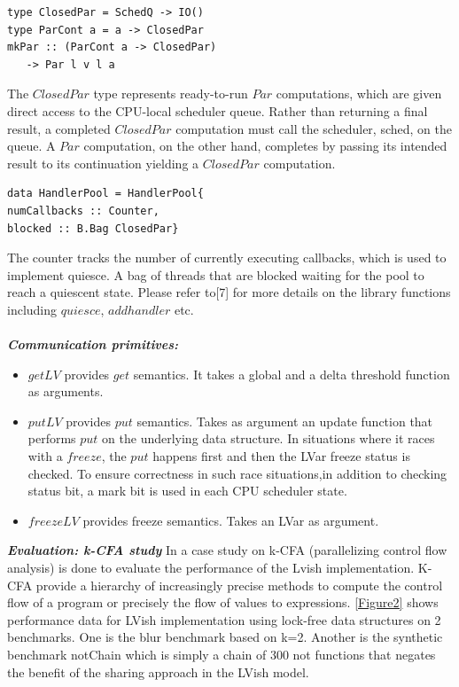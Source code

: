 \documentclass[twocolumn]{article}
\begin{document}
\begin{verbatim}
type ClosedPar = SchedQ -> IO()
type ParCont a = a -> ClosedPar
mkPar :: (ParCont a -> ClosedPar)
   -> Par l v l a
\end{verbatim}
The $ClosedPar$ type represents ready-to-run $Par$ computations, which are given direct access to the CPU-local scheduler queue. Rather than returning a final result, a completed $ClosedPar$ computation must call the scheduler, sched, on the queue. A $Par$
computation, on the other hand, completes by passing its intended result to its continuation yielding a $ClosedPar$ computation.
\begin{verbatim}
data HandlerPool = HandlerPool{
numCallbacks :: Counter,
blocked :: B.Bag ClosedPar}
\end{verbatim}
The counter tracks the number of currently executing callbacks, which is used to implement quiesce. A bag of threads that are blocked waiting for the pool to reach a quiescent state. Please refer to[7] for more details on the library functions
including $quiesce$, $addhandler$ etc.\\ \\
\textbf{\textit{Communication primitives:}}
\begin{itemize}
\item $getLV$ provides $get$ semantics. It takes a global and a delta threshold function as arguments.
\item $putLV$ provides $put$ semantics. Takes as argument an update function that performs $put$ on the underlying data structure. In situations where it races with a $freeze$, the $put$ happens first and then the LVar freeze status is checked.
To ensure correctness in such race situations,in addition to checking status bit, a mark bit is used in each CPU scheduler state.
\item $freezeLV$ provides freeze semantics. Takes an LVar as argument.
\end{itemize}
\textbf{\textit{Evaluation: k-CFA study}} In \cite{lkuper2} a case study on k-CFA (parallelizing control flow analysis) is done to evaluate the performance of the Lvish implementation. K-CFA provide a hierarchy of increasingly precise methods to compute the control 
flow of a program or precisely the flow of values to expressions. \ref{Figure2} shows performance data for LVish implementation using lock-free data structures on 2 benchmarks. One is the blur benchmark based on k=2. Another is the synthetic benchmark notChain which is simply a chain of 300 not functions that negates the benefit of the sharing approach in the LVish model.\\ \\
\end{document}

